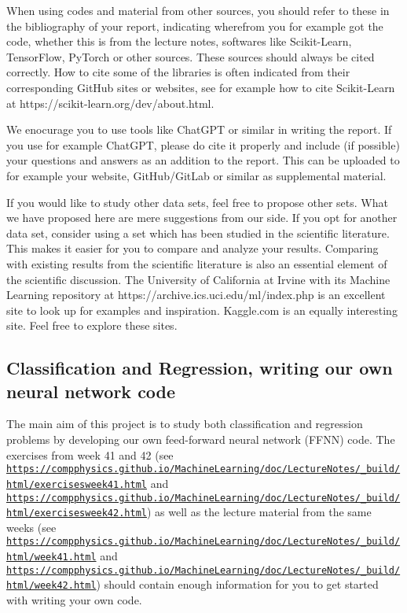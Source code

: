 \documentclass[%
oneside,                 %
final,                   %
10pt]{article}
\begin{document}
When using codes and material from other sources, you should refer to
these in the bibliography of your report, indicating wherefrom you for
example got the code, whether this is from the lecture notes,
softwares like Scikit-Learn, TensorFlow, PyTorch or other
sources. These sources should always be cited correctly. How to cite
some of the libraries is often indicated from their corresponding
GitHub sites or websites, see for example how to cite Scikit-Learn at
https://scikit-learn.org/dev/about.html.

We enocurage you to use tools like ChatGPT or similar in writing the
report. If you use for example ChatGPT, please do cite it properly and
include (if possible) your questions and answers as an addition to the
report. This can be uploaded to for example your website,
GitHub/GitLab or similar as supplemental material.

If you would like to study other data sets, feel free to propose other
sets. What we have proposed here are mere suggestions from our
side. If you opt for another data set, consider using a set which has
been studied in the scientific literature. This makes it easier for
you to compare and analyze your results. Comparing with existing
results from the scientific literature is also an essential element of
the scientific discussion. The University of California at Irvine with
its Machine Learning repository at
https://archive.ics.uci.edu/ml/index.php is an excellent site to look
up for examples and inspiration. Kaggle.com is an equally interesting
site. Feel free to explore these sites. 

\subsection{Classification and Regression, writing our own neural network code}

The main aim of this project is to study both classification and
regression problems by developing our own 
feed-forward neural network (FFNN) code. The exercises from week 41 and 42 (see \href{{https://compphysics.github.io/MachineLearning/doc/LectureNotes/_build/html/exercisesweek41.html}}{\nolinkurl{https://compphysics.github.io/MachineLearning/doc/LectureNotes/_build/html/exercisesweek41.html}} and \href{{https://compphysics.github.io/MachineLearning/doc/LectureNotes/_build/html/exercisesweek42.html}}{\nolinkurl{https://compphysics.github.io/MachineLearning/doc/LectureNotes/_build/html/exercisesweek42.html}}) as well as the lecture material from the same weeks (see  \href{{https://compphysics.github.io/MachineLearning/doc/LectureNotes/_build/html/week41.html}}{\nolinkurl{https://compphysics.github.io/MachineLearning/doc/LectureNotes/_build/html/week41.html}} and \href{{https://compphysics.github.io/MachineLearning/doc/LectureNotes/_build/html/week42.html}}{\nolinkurl{https://compphysics.github.io/MachineLearning/doc/LectureNotes/_build/html/week42.html}}) should contain enough information for you to get started with writing your own code.
\end{document}
